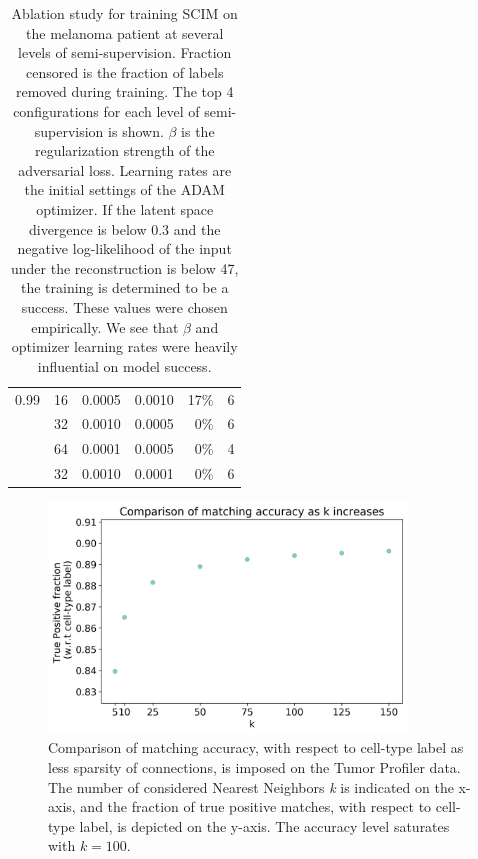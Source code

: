 \begin{table}[h]
\begin{tabular}{rrrrrr}
0.99 &      16 &            0.0005 &  0.0010 &         17\% &           6 \\
     &      32 &            0.0010 &  0.0005 &          0\% &           6 \\
     &      64 &            0.0001 &  0.0005 &          0\% &           4 \\
     &      32 &            0.0010 &  0.0001 &          0\% &           6 \\
\bottomrule
\end{tabular}
\caption{
    Ablation study for training SCIM on the melanoma patient at several levels of semi-supervision.
    Fraction censored is the fraction of labels removed during training.
    The top 4 configurations for each level of semi-supervision is shown.
    $\beta$ is the regularization strength of the adversarial loss.
    Learning rates are the initial settings of the ADAM optimizer.
    If the latent space divergence is below 0.3 and
    the negative log-likelihood of the input under the reconstruction is below 47,
    the training is determined to be a success. These values were chosen empirically.
    We see that $\beta$ and optimizer learning rates were heavily influential on model success.
}
\label{tbl:ablation_menytek}
\end{table}

\begin{figure}[h]
    \centering
    \includegraphics[width=0.85\textwidth]{figures/integration/matching-tune-k-unicapacity.png}
    \caption{Comparison of matching accuracy, with respect to cell-type label as less sparsity of connections, is imposed on the Tumor Profiler data.
The number of considered Nearest Neighbors \textit{k} is indicated on the x-axis, and the fraction of true positive matches, with respect to cell-type label, is depicted on the y-axis.
 The accuracy level saturates with $k=100$.}
    \label{fig:matching_accuracy_log10_uni}
\end{figure}

